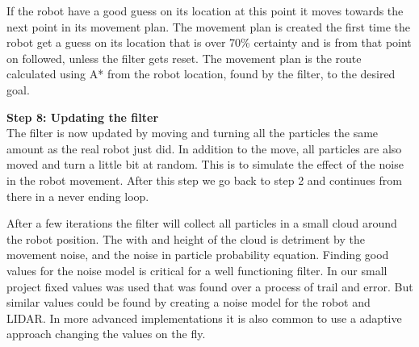 If the robot have a good guess on its location at this point it moves towards the next point in its movement plan. The movement plan is created the first time the robot get a guess on its location that is over 70\% certainty and is from that point on followed, unless the filter gets reset. The movement plan is the route calculated using A* from the robot location, found by the filter, to the desired goal. 

\textbf{Step 8: Updating the filter}\\
The filter is now updated by moving and turning all the particles the same amount as the real robot just did. In addition to the move, all particles are also moved and turn a little bit at random. This is to simulate the effect of the noise in the robot movement. After this step we go back to step 2 and continues from there in a never ending loop. 

After a few iterations the filter will collect all particles in a small cloud around the robot position. The with and height of the cloud is detriment by the movement noise, and the noise in particle probability equation. Finding good values for the noise model is critical for a well functioning filter. In our small project fixed values was used that was found over a process of trail and error. But similar values could be found by creating a noise model for the robot and LIDAR. In more advanced implementations it is also common to use a adaptive approach changing the values on the fly. 


 
